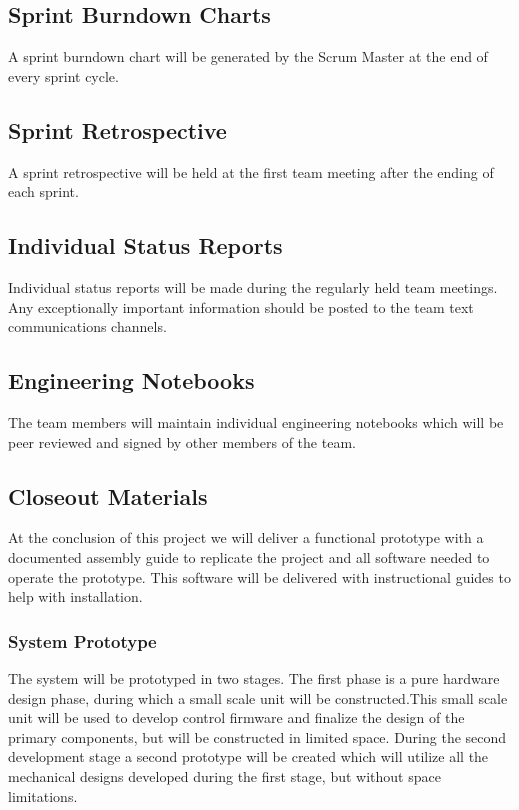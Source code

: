 \subsection{Sprint Burndown Charts}
A sprint burndown chart will be generated by the Scrum Master at the end of every sprint cycle. 

\subsection{Sprint Retrospective}
A sprint retrospective will be held at the first team meeting after the ending of each sprint. 

\subsection{Individual Status Reports}
Individual status reports will be made during the regularly held team meetings. Any exceptionally important information should be posted to the team text communications channels.

\subsection{Engineering Notebooks}
The team members will maintain individual engineering notebooks which will be peer reviewed and signed by other members of the team.

\subsection{Closeout Materials}
At the conclusion of this project we will deliver a functional prototype with a documented assembly guide to replicate the project and all software needed to operate the prototype. This software will be delivered with instructional guides to help with installation. 

\subsubsection{System Prototype}
The system will be prototyped in two stages. The first phase is a pure hardware design phase, during which a small scale unit will be constructed.This small scale unit will be used to develop control firmware and finalize the design of the primary components, but will be constructed in limited space. During the second development stage a second prototype will be created which will utilize all the mechanical designs developed during the first stage, but without space limitations. 

